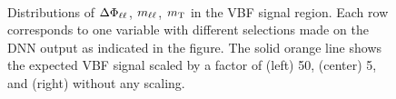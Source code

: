 \begin{figure}[h]
{        } \\
        {\caption{Distributions of $\Delta\Phi_{\ell\ell}$, $m_{\ell\ell}$, $m_{\text T}$ in the VBF \TwoJet signal region.
                Each row corresponds to one variable with different selections made on the DNN output as indicated in the figure. The solid orange line shows the expected VBF signal scaled by a factor of (left) 50, (center) 5, and (right) without any scaling.
                \label{fig:dnn-inputs-hwwdecay} }}
    \end{figure}



